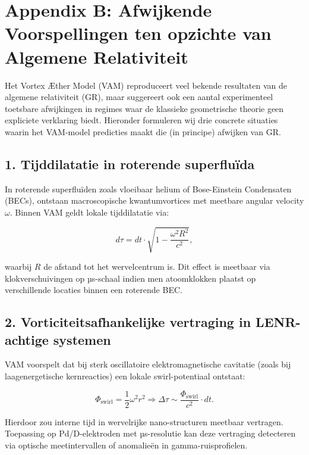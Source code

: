\section*{Appendix B: Afwijkende Voorspellingen ten opzichte van Algemene Relativiteit}
\label{appendix:AfwijkendeVoorspellingen}

Het Vortex Æther Model (VAM) reproduceert veel bekende resultaten van de algemene relativiteit (GR), maar suggereert ook een aantal experimenteel toetsbare afwijkingen in regimes waar de klassieke geometrische theorie geen expliciete verklaring biedt. Hieronder formuleren wij drie concrete situaties waarin het VAM-model predicties maakt die (in principe) afwijken van GR.

\subsection*{1. Tijddilatatie in roterende superfluïda}

In roterende superfluïden zoals vloeibaar helium of Bose-Einstein Condensaten (BECs), ontstaan macroscopische kwantumvortices met meetbare angular velocity \( \omega \). Binnen VAM geldt lokale tijddilatatie via:

\begin{equation}
    d\tau = dt \cdot \sqrt{1 - \frac{\omega^2 R^2}{c^2}},\label{eq:vortex_tau}
\end{equation}

waarbij \( R \) de afstand tot het wervelcentrum is. Dit effect is meetbaar via klokverschuivingen op µs-schaal indien men atoomklokken plaatst op verschillende locaties binnen een roterende BEC.

\subsection*{2. Vorticiteitsafhankelijke vertraging in LENR-achtige systemen}

VAM voorspelt dat bij sterk oscillatoire elektromagnetische cavitatie (zoals bij laagenergetische kernreacties) een lokale swirl-potentiaal ontstaat:

\begin{equation}
    \Phi_\text{swirl} = \frac{1}{2} \omega^2 r^2 \Rightarrow \Delta \tau \sim \frac{\Phi_\text{swirl}}{c^2} \cdot dt.\label{eq:swirl_tau}
\end{equation}

Hierdoor zou interne tijd in wervelrijke nano-structuren meetbaar vertragen. Toepassing op Pd/D-elektroden met µs-resolutie kan deze vertraging detecteren via optische meetintervallen of anomalieën in gamma-ruisprofielen.

